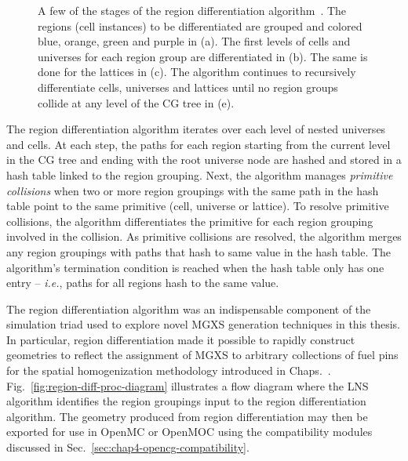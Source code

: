 \begin{figure}[p]
\begin{subfigure}{\textwidth}
  \caption{}
  \label{fig:differentation-5}
\end{subfigure}
\caption[A few stages of the OpenCG region differentiation algorithm]{A few of the stages of the region differentiation algorithm~\cite{boyd2015opencg}. The regions (cell instances) to be differentiated are grouped and colored blue, orange, green and purple in (a). The first levels of cells and universes for each region group are differentiated in (b). The same is done for the lattices in (c). The algorithm continues to recursively differentiate cells, universes and lattices until no region groups collide at any level of the CG tree in (e).}
\label{fig:region-differentiation}
\end{figure}

The region differentiation algorithm iterates over each level of nested universes and cells. At each step, the paths for each region starting from the current level in the \ac{CG} tree and ending with the root universe node are hashed and stored in a hash table linked to the region grouping. Next, the algorithm manages \textit{primitive collisions} when two or more region groupings with the same path in the hash table point to the same primitive (cell, universe or lattice). To resolve primitive collisions, the algorithm differentiates the primitive for each region grouping involved in the collision. As primitive collisions are resolved, the algorithm merges any region groupings with paths that hash to same value in the hash table. The algorithm's termination condition is reached when the hash table only has one entry -- \textit{i.e.}, paths for all regions hash to the same value.

The region differentiation algorithm was an indispensable component of the simulation triad used to explore novel \ac{MGXS} generation techniques in this thesis. In particular, region differentiation made it possible to rapidly construct geometries to reflect the assignment of \ac{MGXS} to arbitrary collections of fuel pins for the spatial homogenization methodology introduced in Chaps.~. Fig.~\ref{fig:region-diff-proc-diagram} illustrates a flow diagram where the \ac{LNS} algorithm identifies the region groupings input to the region differentiation algorithm. The geometry produced from region differentiation may then be exported for use in OpenMC or OpenMOC using the compatibility modules discussed in Sec.~\ref{sec:chap4-opencg-compatibility}.


